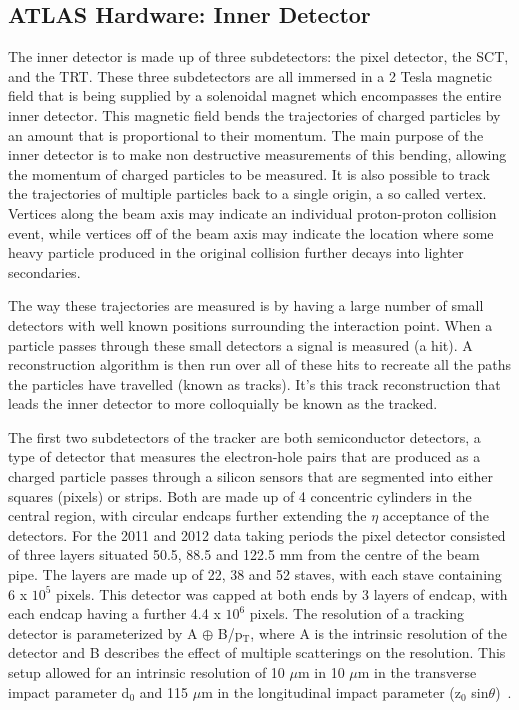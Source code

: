 \subsection{ATLAS Hardware: Inner Detector}

The inner detector is made up of three subdetectors: the pixel detector, the \gls{SCT}, and the \gls{TRT}.  
These three subdetectors are all immersed in a 2 Tesla magnetic field that is being supplied by a solenoidal magnet which encompasses the entire inner detector.  
This magnetic field bends the trajectories of charged particles by an amount that is proportional to their momentum.  
The main purpose of the inner detector is to make non destructive measurements of this bending, allowing the momentum of charged particles to be measured.  
It is also possible to track the trajectories of multiple particles back to a single origin, a so called vertex.  
Vertices along the beam axis may indicate an individual proton-proton collision event, while vertices off of the beam axis may indicate the location where some heavy particle produced in the original collision further decays into lighter secondaries.  
 
The way these trajectories are measured is by having a large number of small detectors with well known positions surrounding the interaction point.  
When a particle passes through these small detectors a signal is measured (a hit).  
A reconstruction algorithm is then run over all of these hits to recreate all the paths the particles have travelled (known as tracks).  
It's this track reconstruction that leads the inner detector to more colloquially be known as the tracked.  

The first two subdetectors of the tracker are both semiconductor detectors, a type of detector that measures the electron-hole pairs that are produced as a charged particle passes through a silicon sensors that are segmented into either squares (pixels) or strips.  
Both are made up of 4 concentric cylinders in the central region, with circular endcaps further extending the $\eta$ acceptance of the detectors.  
For the 2011 and 2012 data taking periods the pixel detector consisted of three layers situated 50.5, 88.5 and 122.5 mm from the centre of the beam pipe.  
The layers are made up of 22, 38 and 52 staves, with each stave containing 6 x $10^5$ pixels.  
This detector was capped at both ends by 3 layers of endcap, with each endcap having a further 4.4 x $10^6$ pixels.  
The resolution of a tracking detector is parameterized by A $\oplus$ B/p$_{\mathrm{T}}$, where A is the intrinsic resolution of the detector and B describes the effect of multiple scatterings on the resolution.  
This setup allowed for an intrinsic resolution of 10 $\mu$m in 10 $\mu$m in the transverse impact parameter d$_{0}$ and 115 $\mu$m in the longitudinal impact parameter (z$_{0}$ sin$\theta$)~\cite{ID3}.  

